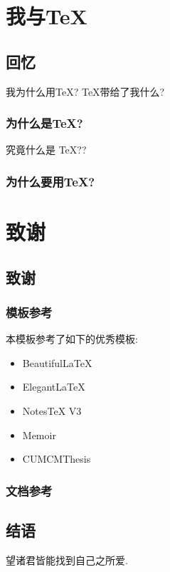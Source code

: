 \documentclass[lang=cn, math=mathptmx]{ZLaTeX}
\begin{document}
\chapter{我与\TeX{}}
\section{回忆}
我为什么用\TeX{}? \TeX{}带给了我什么?

\subsection{为什么是\TeX{}?}
究竟什么是 \TeX{}??

\subsection{为什么要用\TeX{}?}



\chapter{致谢}
\section{致谢}
\subsection{模板参考}
本模板参考了如下的优秀模板:
\begin{itemize}
    \item Beautiful\LaTeX{}
    \item Elegant\LaTeX{}
    \item Notes\TeX{} V3
    \item Memoir
    \item CUMCMThesis
\end{itemize}

\subsection{文档参考}



\section{结语}
望诸君皆能找到自己之所爱.
\end{document}
